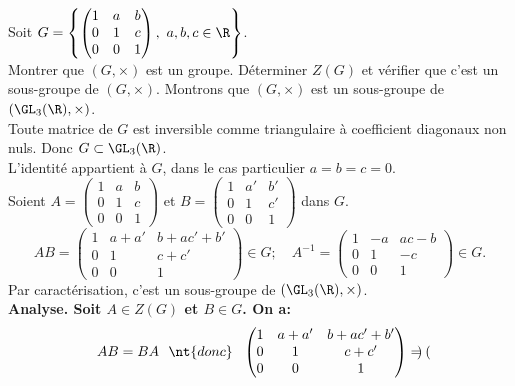 \documentclass[11pt]{article}
\begin{document}
\begin{ex}{}{}
    Soit $G=\left\{ \begin{pmatrix} 1 & a & b \\ 0 & 1 & c \\ 0 & 0 & 1\end{pmatrix}, ~ a,b,c\in\R \right\}$.\\
    Montrer que $(G,\times)$ est un groupe. Déterminer $Z(G)$ et vérifier que c'est un sous-groupe de $(G,\times)$.
    \tcblower
     Montrons que $(G,\times)$ est un sous-groupe de $(\GL_3(\R),\times)$.\\
    Toute matrice de $G$ est inversible comme triangulaire à coefficient diagonaux non nuls. Donc $G\subset\GL_3(\R)$.\\
    L'identité appartient à $G$, dans le cas particulier $a=b=c=0$.\\
    Soient $A=\begin{pmatrix}1&a&b\\0&1&c\\0&0&1\end{pmatrix}$ et $B=\begin{pmatrix}1&a'&b'\\0&1&c'\\0&0&1\end{pmatrix}$ dans $G$.
    \begin{equation*}
        AB=\begin{pmatrix}
            1 & a+a' & b + ac' + b' \\
            0 & 1 & c+c' \\
            0 & 0 & 1
        \end{pmatrix}\in G; \quad A^{-1}= \begin{pmatrix}
            1 & -a & ac-b \\
            0 & 1 & -c \\
            0 & 0 & 1
        \end{pmatrix} \in G.
    \end{equation*}
    Par caractérisation, c'est un sous-groupe de $(\GL_3(\R),\times)$.\\
     \bf{Analyse.} Soit $A\in Z(G)$ et $B\in G$. On a:
    \begin{equation*}
        AB=BA ~~\nt{donc}~~ \begin{pmatrix}
            1&a+a'&b+ac'+b'\\
            0&1&c+c'\\
            0&0&1
        \end{pmatrix}= \begin{pmatrix}

\end{pmatrix}
\end{equation*}
\end{ex}
\end{document}
